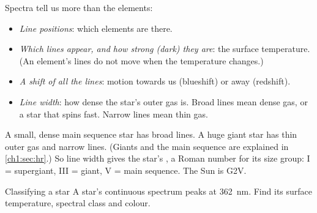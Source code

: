 Spectra tell us more than the elements:
\begin{itemize}
  \item \emph{Line positions}: which elements are there.
  \item \emph{Which lines appear, and how strong (dark) they are}: the surface
        temperature. (An element's lines do not move when the temperature changes.)
  \item \emph{A shift of all the lines}: motion towards us (blueshift) or away (redshift).
  \item \emph{Line width}: how dense the star's outer gas is. Broad lines mean dense gas,
        or a star that spins fast. Narrow lines mean thin gas.
\end{itemize}
A small, dense main sequence star has broad lines. A huge giant star has thin outer gas
and narrow lines. (Giants and the main sequence are explained in \cref{ch1:sec:hr}.) So
line width gives the star's , a Roman number for its size group:
I = supergiant, III = giant, V = main sequence. The Sun is G2V.

\begin{workedexample}{Classifying a star}\label{ch1:we:classify}
A star's continuous spectrum peaks at \qty{362}{nm}. Find its surface temperature,
spectral class and colour.
\end{workedexample}


